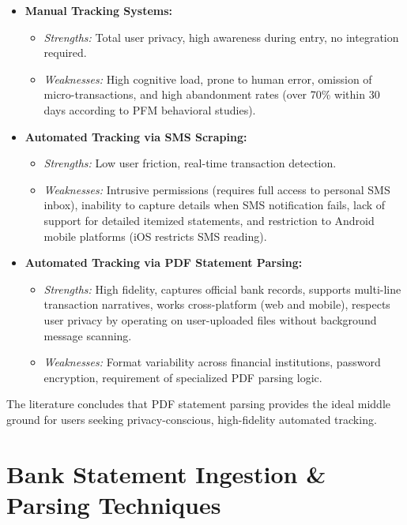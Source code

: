 \documentclass[../Project-Report-Main.tex]{subfiles}
\begin{document}
\begin{itemize}
 \item \textbf{Manual Tracking Systems:}
 \begin{itemize}
   \item \textit{Strengths:} Total user privacy, high awareness during entry, no integration required.
   \item \textit{Weaknesses:} High cognitive load, prone to human error, omission of micro-transactions, and high abandonment rates (over 70\% within 30 days according to PFM behavioral studies).
 \end{itemize}

 \item \textbf{Automated Tracking via SMS Scraping:}
 \begin{itemize}
   \item \textit{Strengths:} Low user friction, real-time transaction detection.
   \item \textit{Weaknesses:} Intrusive permissions (requires full access to personal SMS inbox), inability to capture details when SMS notification fails, lack of support for detailed itemized statements, and restriction to Android mobile platforms (iOS restricts SMS reading).
 \end{itemize}

 \item \textbf{Automated Tracking via PDF Statement Parsing:}
 \begin{itemize}
   \item \textit{Strengths:} High fidelity, captures official bank records, supports multi-line transaction narratives, works cross-platform (web and mobile), respects user privacy by operating on user-uploaded files without background message scanning.
   \item \textit{Weaknesses:} Format variability across financial institutions, password encryption, requirement of specialized PDF parsing logic.
 \end{itemize}
\end{itemize}

The literature concludes that PDF statement parsing provides the ideal middle ground for users seeking privacy-conscious, high-fidelity automated tracking.

\section{Bank Statement Ingestion \& Parsing Techniques}
\end{document}

